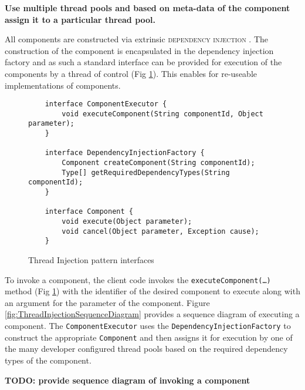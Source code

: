 \documentclass[prodmode]{style/acmlarge}
\begin{document}
\textbf{Use multiple thread pools and based on meta-data of the component assign it to a particular thread pool.}

All components are constructed via extrinsic \textsc{dependency injection}
\cite{ioc}.  The construction of the component is encapsulated in the dependency
injection factory and as such a standard interface can be provided for execution
of the components by a thread of control (Fig
\ref{fig:ThreadInjectionInterfaces}).  This enables for re-useable
implementations of components.

\begin{figure}[tp]
\centering
\begin{verbatim}
    interface ComponentExecutor {
        void executeComponent(String componentId, Object parameter);
    }

    interface DependencyInjectionFactory {
        Component createComponent(String componentId);
        Type[] getRequiredDependencyTypes(String componentId);
    }

    interface Component {
        void execute(Object parameter);
        void cancel(Object parameter, Exception cause);
    }    
\end{verbatim}
\caption{Thread Injection pattern interfaces\footnotemark}
\label{fig:ThreadInjectionInterfaces}
\end{figure}

To invoke a component, the client code invokes the
\texttt{executeComponent(\ldots)} method (Fig
\ref{fig:ThreadInjectionInterfaces}) with the identifier of the desired
component to execute along with an argument for the parameter of the component.
Figure \ref{fig:ThreadInjectionSequenceDiagram} provides a sequence diagram of
executing a component.  The \texttt{ComponentExecutor} uses the
\texttt{DependencyInjectionFactory} to construct the appropriate
\texttt{Component} and then assigns it for execution by one of the many
developer configured thread pools based on the required dependency types of the
component.

\textbf{TODO: provide sequence diagram of invoking a component}
\end{document}
